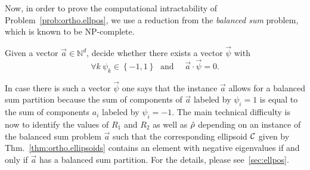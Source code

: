 Now, in order to prove the computational intractability of Problem~\ref{prob:ortho.ellpos}, we use a reduction from the \emph{balanced sum} problem, which is known to be NP-complete.
\begin{problem}\label{prob:ellpos.balanced_sum}
  Given a vector $\vec a \in \mathbb{N}^d$, decide whether there exists a vector $\vec \psi$ with
  \[
    \forall{k}\:\psi_{k}\in\left\{ -1,1\right\} \;\textrm{ and }\quad \vec a \cdot \vec\psi=0.
    \label{eq:ellpos.partition_vector}
  \]
\end{problem}
In case there is such a vector $\vec \psi$ one says that the instance $\vec a$ allows for a balanced sum partition because the sum of components of $\vec a$ labeled by $\psi_i = 1$ is equal to the sum of components $a_i$ labeled by $\psi_i = -1$.
The main technical difficulty is now to identify the values of $R_1$ and $R_2$ as well as $\hat{\rho}$ depending on an instance of the balanced sum problem $\vec a$ such that the corresponding ellipsoid $\mathcal{C}$ given by Thm.~\ref{thm:ortho.ellipsoids} contains an element with negative eigenvalues if and only if $\vec a$ has a balanced sum partition.
For the details, please see~\ref{sec:ellpos}.

